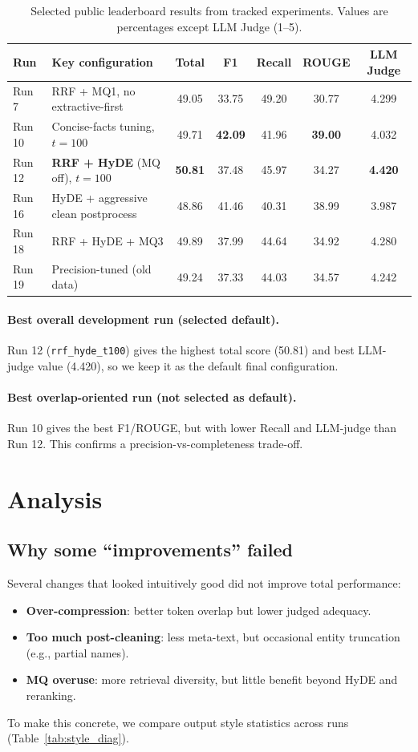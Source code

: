 \documentclass[11pt,twocolumn]{article}
\begin{document}
\begin{table}[t]
\centering
\small
\begin{tabular}{l l c c c c c}
\toprule
\textbf{Run} & \textbf{Key configuration} & \textbf{Total} & \textbf{F1} & \textbf{Recall} & \textbf{ROUGE} & \textbf{LLM Judge} \\
\midrule
Run 7 & RRF + MQ1, no extractive-first & 49.05 & 33.75 & 49.20 & 30.77 & 4.299 \\
Run 10 & Concise-facts tuning, $t=100$ & 49.71 & \textbf{42.09} & 41.96 & \textbf{39.00} & 4.032 \\
Run 12 & \textbf{RRF + HyDE} (MQ off), $t=100$ & \textbf{50.81} & 37.48 & 45.97 & 34.27 & \textbf{4.420} \\
Run 16 & HyDE + aggressive clean postprocess & 48.86 & 41.46 & 40.31 & 38.99 & 3.987 \\
Run 18 & RRF + HyDE + MQ3 & 49.89 & 37.99 & 44.64 & 34.92 & 4.280 \\
Run 19 & Precision-tuned (old data) & 49.24 & 37.33 & 44.03 & 34.57 & 4.242 \\
\bottomrule
\end{tabular}
\caption{Selected public leaderboard results from tracked experiments. Values are percentages except LLM Judge (1--5).}
\label{tab:main_results}
\end{table}

\paragraph{Best overall development run (selected default).}
Run 12 (\texttt{rrf\_hyde\_t100}) gives the highest total score (50.81) and best LLM-judge value (4.420), so we keep it as the default final configuration.

\paragraph{Best overlap-oriented run (not selected as default).}
Run 10 gives the best F1/ROUGE, but with lower Recall and LLM-judge than Run 12. This confirms a precision-vs-completeness trade-off.

\section{Analysis}
\subsection{Why some ``improvements'' failed}
Several changes that looked intuitively good did not improve total performance:
\begin{itemize}
    \item \textbf{Over-compression}: better token overlap but lower judged adequacy.
    \item \textbf{Too much post-cleaning}: less meta-text, but occasional entity truncation (e.g., partial names).
    \item \textbf{MQ overuse}: more retrieval diversity, but little benefit beyond HyDE and reranking.
\end{itemize}
To make this concrete, we compare output style statistics across runs (Table~\ref{tab:style_diag}).
\end{document}

